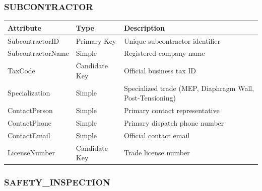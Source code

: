 \documentclass[a4paper,12pt]{report}
\newcounter{none} %
\begin{document}
\subsubsection{SUBCONTRACTOR}\label{subcontractor}

{\def\LTcaptype{none} %
\begin{longtable}[]{@{}
  >{\raggedright\arraybackslash}p{}
  >{\raggedright\arraybackslash}p{}
  >{\raggedright\arraybackslash}p{}@{}}
\toprule\noalign{}
\begin{minipage}[b]{\linewidth}\raggedright
Attribute
\end{minipage} & \begin{minipage}[b]{\linewidth}\raggedright
Type
\end{minipage} & \begin{minipage}[b]{\linewidth}\raggedright
Description
\end{minipage} \\
\midrule\noalign{}
\endhead
\bottomrule\noalign{}
\endlastfoot
SubcontractorID & Primary Key & Unique subcontractor identifier \\
SubcontractorName & Simple & Registered company name \\
TaxCode & Candidate Key & Official business tax ID \\
Specialization & Simple & Specialized trade (\allowbreak{}MEP, Diaphragm Wall, Post-Tensioning) \\
ContactPerson & Simple & Primary contact representative \\
ContactPhone & Simple & Primary dispatch phone number \\
ContactEmail & Simple & Official contact email \\
LicenseNumber & Candidate Key & Trade license number \\
\end{longtable}
}

\subsubsection{\texorpdfstring{SAFETY\texorpdfstring{\_\allowbreak{}}{_}INSPECTION}{SAFETYINSPECTION}}\label{safety_inspection}
\end{document}
